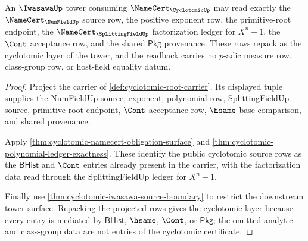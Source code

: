 \begin{theorem}
\label{thm:cyclotomic-iwasawa-tower-source-readback}
An $\IwasawaUp$ tower consuming $\NameCert_{\CyclotomicUp}$ may read exactly the $\NameCert_{\NumFieldUp}$ source row, the positive exponent row, the primitive-root endpoint, the $\NameCert_{\SplittingFieldUp}$ factorization ledger for $X^n-1$, the $\Cont$ acceptance row, and the shared $\mathsf{Pkg}$ provenance. These rows repack as the cyclotomic layer of the tower, and the readback carries no $p$-adic measure row, class-group row, or host-field equality datum.
\end{theorem}
\begin{proof}
Project the carrier of \autoref{def:cyclotomic-root-carrier}. Its displayed tuple supplies the NumFieldUp source, exponent, polynomial row, SplittingFieldUp source, primitive-root endpoint, $\Cont$ acceptance row, $\hsame$ base comparison, and shared provenance.

Apply \autoref{thm:cyclotomic-namecert-obligation-surface} and \autoref{thm:cyclotomic-polynomial-ledger-exactness}. These identify the public cyclotomic source rows as the $\mathsf{BHist}$ and $\Cont$ entries already present in the carrier, with the factorization data read through the SplittingFieldUp ledger for $X^n-1$.

Finally use \autoref{thm:cyclotomic-iwasawa-source-boundary} to restrict the downstream tower surface. Repacking the projected rows gives the cyclotomic layer because every entry is mediated by $\mathsf{BHist}$, $\hsame$, $\Cont$, or $\mathsf{Pkg}$; the omitted analytic and class-group data are not entries of the cyclotomic certificate.
\end{proof}

